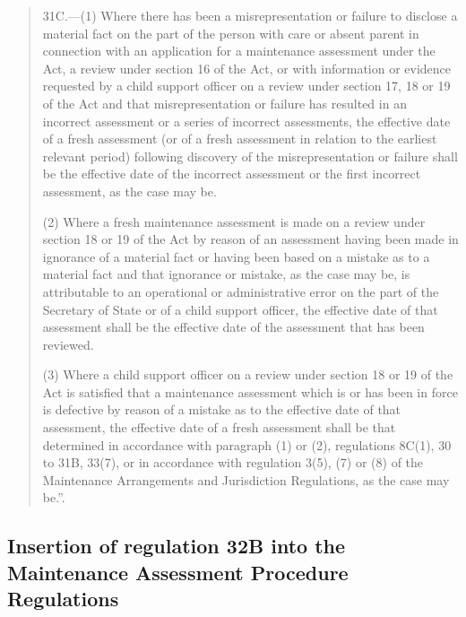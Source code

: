 \documentclass[a4paper]{article}
\begin{document}
\begin{quotation}
31C.—(1) Where there has been a misrepresentation or failure to disclose a material fact on the part of the person with care or absent parent in connection with an application for a maintenance assessment under the Act, a review under section 16 of the Act, or with information or evidence requested by a child support officer on a review under section 17, 18 or 19 of the Act and that misrepresentation or failure has resulted in an incorrect assessment or a series of incorrect assessments, the effective date of a fresh assessment (or of a fresh assessment in relation to the earliest relevant period) following discovery of the misrepresentation or failure shall be the effective date of the incorrect assessment or the first incorrect assessment, as the case may be.

(2) Where a fresh maintenance assessment is made on a review under section 18 or 19 of the Act by reason of an assessment having been made in ignorance of a material fact or having been based on a mistake as to a material fact and that ignorance or mistake, as the case may be, is attributable to an operational or administrative error on the part of the Secretary of State or of a child support officer, the effective date of that assessment shall be the effective date of the assessment that has been reviewed.

(3) Where a child support officer on a review under section 18 or 19 of the Act is satisfied that a maintenance assessment which is or has been in force is defective by reason of a mistake as to the effective date of that assessment, the effective date of a fresh assessment shall be that determined in accordance with paragraph (1) or (2), regulations 8C(1), 30 to 31B, 33(7), or in accordance with regulation 3(5), (7) or (8) of the Maintenance Arrangements and Jurisdiction Regulations, as the case may be.”.
\end{quotation}

\subsection[35. Insertion of regulation 32B into the Maintenance Assessment Procedure Regulations]{Insertion of regulation 32B into the Maintenance Assessment Procedure Regulations}
\end{document}
